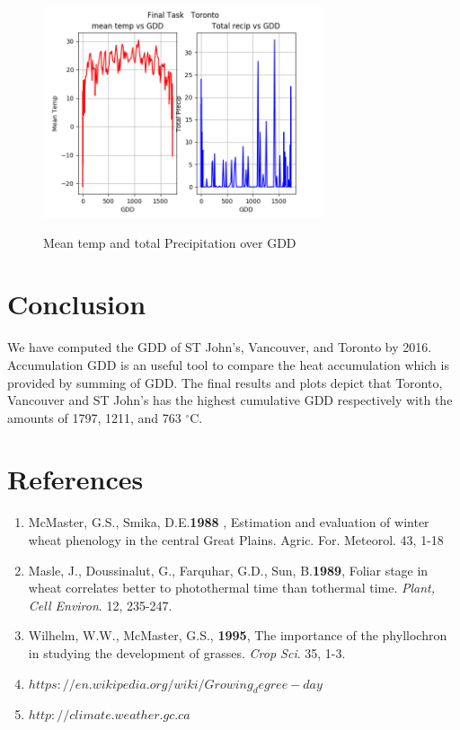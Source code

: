 \documentclass{article}
\begin{document}
\begin{enumerate}
\begin{center}
\begin{figure}[H]
\includegraphics[width=3.25in]{finalTaskToronto.png}\\

\caption{Mean temp and total Precipitation over GDD}
\label{freeTask}
\end{figure}
\end{center}
\end{enumerate}





\section{Conclusion}
We have computed the GDD of ST John's, Vancouver, and Toronto by 2016. Accumulation GDD is an useful tool to compare the heat accumulation which is provided by summing of GDD. The final results and plots depict that Toronto, Vancouver and ST John's has the highest cumulative GDD respectively with the amounts of 1797, 1211, and 763 $^{\circ}$C.
 

\section{References}
%
\begin{enumerate}
\item McMaster, G.S., Smika, D.E.\textbf{1988} , Estimation and evaluation of winter wheat phenology in the central Great Plains. Agric. For. Meteorol. 43, 1-18
\item Masle, J., Doussinalut, G., Farquhar, G.D., Sun, B.\textbf{1989}, Foliar stage in wheat correlates better to photothermal time than tothermal time. \textit{Plant, Cell Environ}. 12, 235-247.
\item Wilhelm, W.W., McMaster, G.S., \textbf{1995}, The importance of the phyllochron in studying the development of grasses.  \textit{Crop Sci}. 35, 1-3.
\item \href{url}{$https://en.wikipedia.org/wiki/Growing_degree-day$}
\item \href{url}{$http://climate.weather.gc.ca$}

\end{enumerate}
\end{document}
